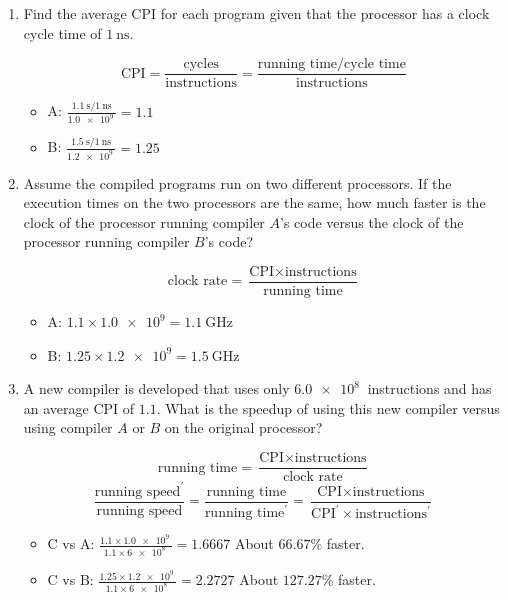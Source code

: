 \documentclass[paper=a4, fontsize=11pt]{scrartcl} %
\begin{document}
\begin{enumerate}
\item
  \begin{fancyquotes}
    Find the average CPI for each program given that the processor has
    a clock cycle time of $\SI{1}{\nano\second}$.
  \end{fancyquotes}

  $$\text{CPI} = \frac{\text{cycles}}{\text{instructions}}
  = \frac{\text{running time} /
    \text{cycle time}}{\text{instructions}}$$

  \begin{itemize}
  \item{A:} $\frac{\SI{1.1}{\second} /
      \SI{1}{\nano\second}}{\SI{1.0e9}{}} = 1.1$
  \item{B:} $\frac{\SI{1.5}{\second} /
      \SI{1}{\nano\second}}{\SI{1.2e9}{}} = 1.25$
  \end{itemize}

\item
  \begin{fancyquotes}
    Assume the compiled programs run on two different processors. If
    the execution times on the two processors are the same, how much
    faster is the clock of the processor running compiler $A$'s code
    versus the clock of the processor running compiler $B$'s code?
  \end{fancyquotes}

  $$\text{clock rate} =
  \frac{\text{CPI}\times\text{instructions}}{\text{running time}}$$

  \begin{itemize}
  \item{A:} $1.1\times\SI{1.0e9} = \SI{1.1}{\giga\hertz}$
  \item{B:} $1.25\times\SI{1.2e9} = \SI{1.5}{\giga\hertz}$
  \end{itemize}

\item
  \begin{fancyquotes}
    A new compiler is developed that uses only $\SI{6.0e8}{}$
    instructions and has an average CPI of $1.1$. What is the speedup
    of using this new compiler versus using compiler $A$ or $B$ on the
    original processor?
  \end{fancyquotes}

  $$\text{running time}
  = \frac{\text{CPI}\times\text{instructions}}{\text{clock rate}}$$
  $$\frac{\text{running speed}^\prime}{\text{running speed}}
  = \frac{\text{running time}}{\text{running time}^{\prime}}
  = \frac{\text{CPI}\times\text{instructions}}
  {\text{CPI}^\prime\times\text{instructions}^\prime}$$

  \begin{itemize}
  \item{C vs A:}
    $\frac{1.1\times \SI{1.0e9}{}} {1.1\times \SI{6e8}{}} = 1.6667$
    About $66.67\%$ faster.
  \item{C vs B:}
    $\frac{1.25\times \SI{1.2e9}{}} {1.1\times \SI{6e8}{}} = 2.2727$
    About $127.27\%$ faster.
  \end{itemize}

\end{enumerate}
\end{document}
